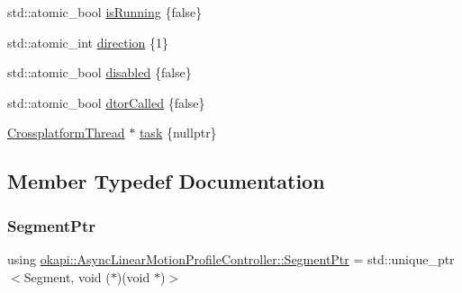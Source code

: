 \begin{DoxyCompactItemize}
std\+::atomic\+\_\+bool \mbox{\hyperlink{classokapi_1_1AsyncLinearMotionProfileController_a587f56ae443b18e8fe0b9feeca624b07}{is\+Running}} \{false\}
\item 
std\+::atomic\+\_\+int \mbox{\hyperlink{classokapi_1_1AsyncLinearMotionProfileController_af82aa4936830711c126e7f00222fdbd8}{direction}} \{1\}
\item 
std\+::atomic\+\_\+bool \mbox{\hyperlink{classokapi_1_1AsyncLinearMotionProfileController_a6fc7e4b240646a8e2a8ecc06701e5ee0}{disabled}} \{false\}
\item 
std\+::atomic\+\_\+bool \mbox{\hyperlink{classokapi_1_1AsyncLinearMotionProfileController_aa876f79a2053e1f6b01519f17ccaebfa}{dtor\+Called}} \{false\}
\item 
\mbox{\hyperlink{classCrossplatformThread}{Crossplatform\+Thread}} $\ast$ \mbox{\hyperlink{classokapi_1_1AsyncLinearMotionProfileController_aa49e2d190f4e8af09fdc4b13951c212d}{task}} \{nullptr\}
\end{DoxyCompactItemize}


\subsection{Member Typedef Documentation}
\mbox{\label{classokapi_1_1AsyncLinearMotionProfileController_a714a13979ef81d5fbca93264d044b8cc}} 
\subsubsection{\texorpdfstring{SegmentPtr}{SegmentPtr}}
{\footnotesize\ttfamily using \mbox{\hyperlink{classokapi_1_1AsyncLinearMotionProfileController_a714a13979ef81d5fbca93264d044b8cc}{okapi\+::\+Async\+Linear\+Motion\+Profile\+Controller\+::\+Segment\+Ptr}} =  std\+::unique\+\_\+ptr$<$Segment, void ($\ast$)(void $\ast$)$>$\hspace{0.3cm}{\ttfamily [protected]}}

\mbox{\label{classokapi_1_1AsyncLinearMotionProfileController_a4793d9c4aebdb9a947b3c5659f919e14}} 
